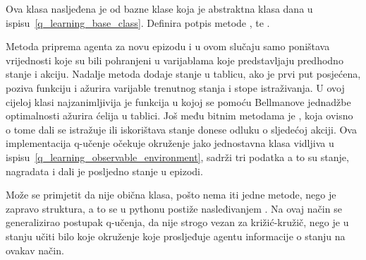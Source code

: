 
Ova klasa nasljeđena je od bazne klase  koja je abstraktna klasa dana u ispisu~\ref{q_learning_base_class}. Definira potpis metode ,  te . 


Metoda  priprema agenta za novu epizodu i u ovom slučaju samo poništava vrijednosti koje su bili pohranjeni u varijablama koje predstavljaju predhodno stanje i akciju. Nadalje metoda  dodaje stanje u tablicu, ako je prvi put posjećena, poziva funkciju  i ažurira varijable trenutnog stanja i stope istraživanja. U ovoj cijeloj klasi najzanimljivija je funkcija  u kojoj se pomoću Bellmanove jednadžbe optimalnosti ažurira ćelija u tablici. Još među bitnim metodama je , koja ovisno o tome dali se istražuje ili iskorištava stanje donese odluku o sljedećoj akciji. Ova implementacija q-učenje očekuje okruženje  jako jednostavna klasa vidljiva u ispisu~\ref{q_learning_observable_environment}, sadrži tri podatka a to su stanje, nagradata i dali je posljedno stanje u epizodi.


Može se primjetit da nije obična klasa, pošto nema iti jedne metode, nego je zapravo struktura, a to se u pythonu postiže nasleđivanjem . Na ovaj način se generalizirao postupak q-učenja, da nije strogo vezan za križić-kružič, nego je u stanju učiti bilo koje okruženje koje prosljeđuje agentu informacije o stanju na ovakav način.

